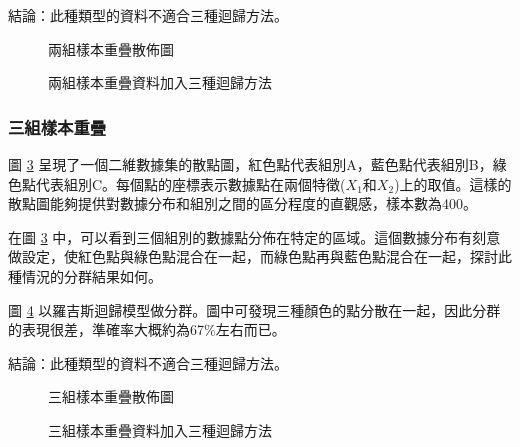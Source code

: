 結論：此種類型的資料不適合三種迴歸方法。

\begin{figure}[H]
    \caption{兩組樣本重疊散佈圖}
    \label{fig:rdn17-scatter}
\end{figure}

\begin{figure}[H]
    \caption{兩組樣本重疊資料加入三種迴歸方法}
    \label{fig:rdn17-LR-result}
\end{figure}


\subsubsection{三組樣本重疊}
圖 \ref{fig:rdn18-scatter} 呈現了一個二維數據集的散點圖，紅色點代表組別A，藍色點代表組別B，綠色點代表組別C。每個點的座標表示數據點在兩個特徵($X_1$和$X_2$)上的取值。這樣的散點圖能夠提供對數據分布和組別之間的區分程度的直觀感，樣本數為400。

在圖 \ref{fig:rdn18-scatter} 中，可以看到三個組別的數據點分佈在特定的區域。這個數據分布有刻意做設定，使紅色點與綠色點混合在一起，而綠色點再與藍色點混合在一起，探討此種情況的分群結果如何。

圖 \ref{fig:rdn18-LR-result} 以羅吉斯迴歸模型做分群。圖中可發現三種顏色的點分散在一起，因此分群的表現很差，準確率大概約為67\%左右而已。

結論：此種類型的資料不適合三種迴歸方法。

\begin{figure}[h]
    \caption{三組樣本重疊散佈圖}
    \label{fig:rdn18-scatter}
\end{figure}

\begin{figure}[h]
    \caption{三組樣本重疊資料加入三種迴歸方法}
    \label{fig:rdn18-LR-result}
\end{figure}
